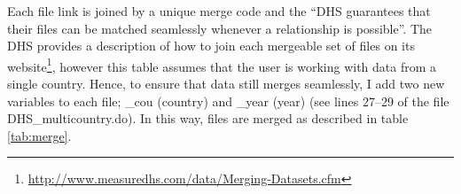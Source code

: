 \documentclass{article}[11pt,subeqn]
\begin{document}
\begin{spacing}{1.25}
\begin{figure}[ht!]
\begin{center}
\begin{tikzpicture}[node distance = 3cm, auto]
    \end{tikzpicture}
\end{center}
\end{figure}

Each file link is joined by a unique merge code and the ``DHS guarantees that their files can be matched 
seamlessly whenever a relationship is possible''.  The DHS provides a description of how to join each 
mergeable set of files on its website\footnote{\url{http://www.measuredhs.com/data/Merging-Datasets.cfm}},
however this table assumes that the user is working with data from a single country.  Hence, to ensure
that data still merges seamlessly, I add two new variables to each file; \_cou (country) and \_year 
(year) (see lines 27--29 of the file DHS\_multicountry.do).  In this way, files are merged as described in 
table \ref{tab:merge}.


\end{spacing}
\end{document}
